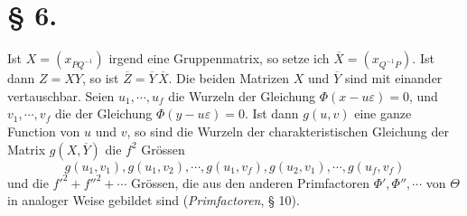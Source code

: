 \documentclass[11pt]{article}
\newcommand{\eps}{\varepsilon}
\begin{document}
\section*{§ 6.}

Ist $X=(x_{PQ^{-1}})$ irgend eine Gruppenmatrix, so setze ich $\overline{X}=(x_{Q^{-1}P})$. Ist dann $Z=XY$, so ist $\overline{Z}=\overline{Y}\,\overline{X}$. Die beiden Matrizen $X$ und $\overline{Y}$ sind mit einander vertauschbar. Seien $u_1,\cdots,u_f$ die Wurzeln der Gleichung $\Phi(x-u\eps)=0$, und $v_1,\cdots,v_f$ die der Gleichung $\Phi(y-u\eps)=0$. Ist dann $g(u,v)$ eine ganze Function von $u$ und $v$, so sind die Wurzeln der charakteristischen Gleichung der Matrix $g(X,\overline{Y})$ die $f^2$ Grössen
\[
g(u_1,v_1),g(u_1,v_2),\cdots,g(u_1,v_f),g(u_2,v_1),\cdots,g(u_f,v_f)
\]
und die $f'^2+f''^2+\cdots$ Grössen, die aus den anderen Primfactoren $\Phi',\Phi'',\cdots$ von $\Theta$ in analoger Weise gebildet sind (\emph{Primfactoren}, § 10).
\end{document}
